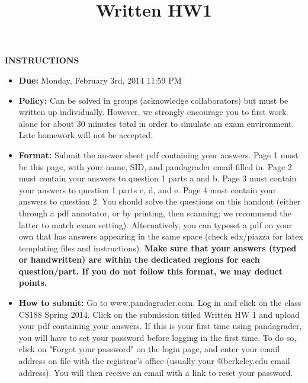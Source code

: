 \documentclass[twoside]{article}
\title{Written HW1}
\begin{document}
\thispagestyle{empty}
\maketitle


\smallskip
\smallskip
\textbf{INSTRUCTIONS}

\begin{itemize}
\item \textbf{Due:} Monday, February 3rd, 2014 11:59 PM
\item \textbf{Policy:} Can be solved in groups (acknowledge collaborators) but must
be written up individually. However,
we strongly encourage you to first work alone for about 30 minutes total in order to simulate an exam environment.  Late homework
will not be accepted.
\item \textbf{Format:}  Submit the answer sheet pdf containing your answers. Page 1
must be this page, with your name,
SID, and pandagrader email filled in. Page 2 must contain your answers
to question 1 parts a and b. Page 3 must contain your answers to question 1 parts c, d, and e. Page 4 must contain your answers to question 2.
You should solve the questions on this handout (either through a pdf annotator, or by printing, then scanning; we recommend the latter to match exam setting). Alternatively, you can typeset a pdf on your own that has answers appearing in the same space (check edx/piazza for latex templating files and instructions).
\textbf{Make sure that your answers (typed or handwritten) are within the
dedicated regions for each question/part.  If you do not follow this format, we may deduct points.}

\item \textbf{How to submit:}  Go to www.pandagrader.com. Log in and click on the
class CS188 Spring 2014. Click
on the submission titled Written HW 1 and upload your pdf containing your answers. If this is your first time using
pandagrader, you will have to set your password before logging in the
first time.  To do so, click on "Forgot your password" on the login
page, and enter your email address on file with the registrar's office
(usually your @berkeley.edu email address). You will then receive an
email with a link to reset your password.

\end{itemize}
\end{document}
